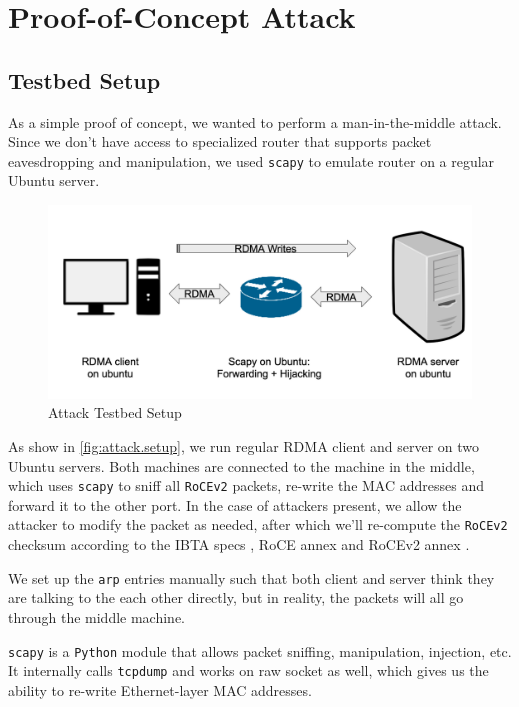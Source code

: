 \section{Proof-of-Concept Attack}
\label{sec:poc.attack}

\subsection{Testbed Setup}
\label{sec:attack.setup}

As a simple proof of concept, we wanted to perform a man-in-the-middle attack.
Since we don't have access to specialized router that supports packet eavesdropping
and manipulation, we used \texttt{scapy} to emulate router on a regular Ubuntu server.

\begin{figure}[ht]
    \centering
    \includegraphics[width=0.5\textwidth - 5pt]{fig/attack_setup}
    \caption{Attack Testbed Setup}
    \label{fig:attack.setup}
\end{figure}

As show in \autoref{fig:attack.setup}, we run regular RDMA client and server
on two Ubuntu servers. Both machines are connected to the machine in the middle,
which uses \texttt{scapy} to sniff all \texttt{RoCEv2} packets, re-write the MAC
addresses and forward it to the other port. In the case of attackers present, we
allow the attacker to modify the packet as needed, after which we'll re-compute
the \texttt{RoCEv2} checksum according to the IBTA specs \cite{infiniband:iba.spec.vol1.v1.3},
RoCE annex \cite{infiniband:iba.spec.annex.roce} and RoCEv2 annex \cite{infiniband:iba.spec.annex.rocev2}.

We set up the \texttt{arp} entries manually such that both client and server think
they are talking to the each other directly, but in reality, the packets will all
go through the middle machine.

\texttt{scapy} is a \texttt{Python} module that allows packet sniffing, manipulation, injection, etc.
It internally calls \texttt{tcpdump} and works on raw socket as well, which gives us the ability to
re-write Ethernet-layer MAC addresses.

